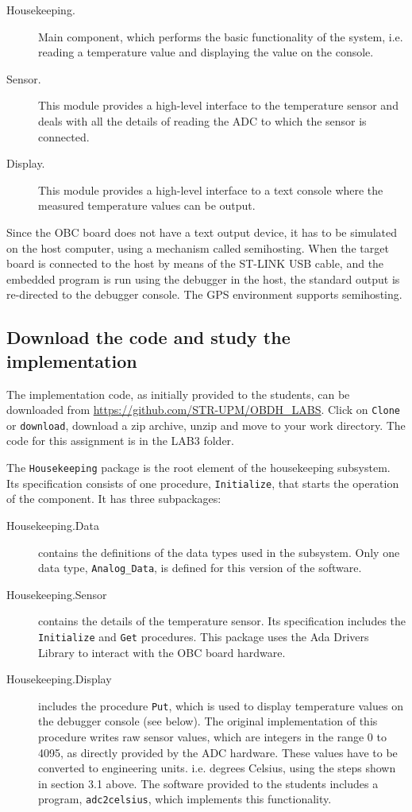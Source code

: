 \begin{description}
\item[Housekeeping.] Main component, which performs the basic functionality of the system, i.e. reading a temperature value and displaying the value on the console.
\item[Sensor.] This module provides a high-level interface to the temperature sensor and deals with all the details of reading the ADC to which the sensor is connected.
\item[Display.] This module provides a high-level interface to a text console where the measured temperature values can be output.
\end{description}

Since the OBC board does not have a text output device, it has to be simulated on the host computer, using a mechanism called semihosting. When the target board is connected to the host by means of the ST-LINK USB cable, and the embedded program is run using the debugger in the host, the standard output is re-directed to the debugger console. The GPS environment supports semihosting.

\subsection{Download the code and study the implementation}

The implementation code, as initially provided to the students, can be downloaded from \url{https://github.com/STR-UPM/OBDH_LABS}. Click on {\tt Clone} or {\tt download}, download a zip archive, unzip and move to your work directory. The code for this assignment is in the LAB3 folder.

The {\tt Housekeeping} package is the root element of the housekeeping subsystem. Its specification consists of one procedure, {\tt Initialize}, that starts the operation of the component. It has three subpackages:

\begin{description}
\item[Housekeeping.Data] contains the definitions of the data types used in the subsystem. Only one data type, {\tt Analog\_Data}, is defined for this version of the software.

\item[Housekeeping.Sensor] contains the details of the temperature sensor. Its specification includes the {\tt Initialize} and {\tt Get} procedures. This package uses the Ada Drivers Library to interact with the OBC board hardware.

\item[Housekeeping.Display] includes the procedure {\tt Put}, which is used to display temperature values on the debugger console (see below). The original implementation of this procedure writes raw sensor values, which are integers in the range 0 to 4095, as directly provided by the ADC hardware. These values have to be converted to engineering units. i.e. degrees Celsius, using the steps shown in section 3.1 above. The software provided to the students includes a program, {\tt adc2celsius}, which implements this functionality.
\end{description}

